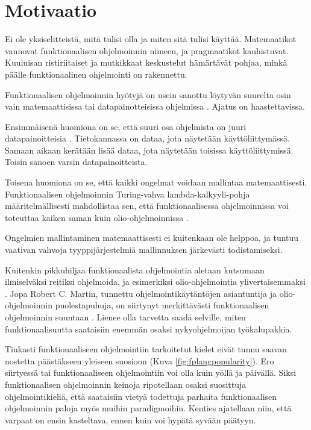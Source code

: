 \clearpage

\chapter{Motivaatio}

Ei ole yksiselitteistä, mitä  tulisi olla ja miten sitä tulisi käyttää. Matemaatikot vannovat funktionaalisen ohjelmoinnin  nimeen, ja pragmaatikot kauhistuvat. Kuuluisan ristiriitaiset ja mutkikkaat keskustelut hämärtävät pohjaa, minkä päälle funktionaalinen ohjelmointi on rakennettu. \citep{stackoverflow_what_monad,stackoverflow:why_monad,promises-spec-94,dear_functional_bros}

Funktionaalisen ohjelmoinnin hyötyjä on usein sanottu löytyvän suurelta osin vain matemaattisissa tai datapainotteisissa ohjelmissa \cite[10]{cantarella_fp_haitat}. Ajatus on haastettavissa.

Ensimmäisenä huomiona on se, että suuri osa ohjelmista on juuri datapainoitteisia \cite{gartnerb2b}. Tietokannassa on dataa, jota näytetään käyttöliittymässä. Samaan aikaan kerätään lisää dataa, jota näytetään toisissa käyttöliittymissä. Toisin sanoen varsin datapainoitteista.

Toisena huomiona on se, että kaikki ongelmat voidaan mallintaa matemaattisesti. Funktionaalisen ohjelmoinnin Turing-vahva lambda-kalkyyli-pohja määritelmällisesti mahdollistaa sen, että funktionaalisessa ohjelmoinnissa voi toteuttaa kaiken saman kuin olio-ohjelmoinnissa \cite{Tan2004,computerphile_lambda}.

Ongelmien mallintaminen matemaattisesti ei kuitenkaan ole helppoa, ja tuntuu vaativan vahvoja tyyppijärjestelmiä mallinnuksen järkevästi todistamiseksi.

Kuitenkin pikkuhiljaa funktionaalista ohjelmointia aletaan kutsumaan ilmiselväksi reitiksi ohjelmoida, ja esimerkiksi olio-ohjelmointia ylivertaisemmaksi \cite[1]{the_oo_way}. Jopa Robert C. Martin, tunnettu ohjelmointikäytäntöjen asiantuntija ja olio-ohjelmoinnin puolestapuhuja, on siirtynyt merkittävästi funktionaalisen ohjelmoinnin suuntaan \cite{martin2019whyclojure,martin2017pragmaticfp}. Lienee olla tarvetta saada selville, miten funktionaalisuutta saataisiin enemmän osaksi nykyohjelmoijan työkalupakkia.
\clearpage

Tiukasti funktionaaliseen ohjelmointiin tarkoitetut kielet eivät tunnu saavan nostetta päästäkseen yleiseen suosioon (Kuva \ref{fig:fplangpopularity}). Ero siirtyessä  tai  funktionaaliseen ohjelmointiin voi olla kuin yöllä ja päivällä. Siksi funktionaalisen ohjelmoinnin keinoja ripotellaan osaksi suosittuja ohjelmointikieliä, että saataisiin vietyä todettuja parhaita funktionaalisen ohjelmoinnin paloja myös muihin paradigmoihin. Kenties ajatellaan niin, että varpaat on ensin kasteltava, ennen kuin voi hypätä syvään päätyyn.


